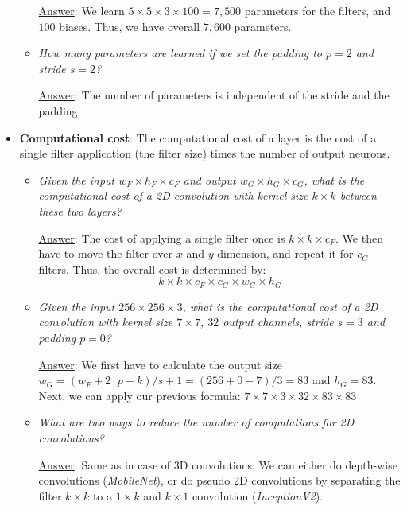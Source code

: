 \begin{itemize}
\begin{itemize}
		\underline{Answer}: We learn $5\times 5\times 3\times 100 = 7,500$ parameters for the filters, and $100$ biases. Thus, we have overall $7,600$ parameters.
		
		\item \textit{How many parameters are learned if we set the padding to $p=2$ and stride $s=2$?}

		\underline{Answer}: The number of parameters is independent of the stride and the padding.
	\end{itemize}
	\item \textbf{Computational cost}: The computational cost of a layer is the cost of a single filter application (the filter size) times the number of output neurons.
	\begin{itemize}
		\item \textit{Given the input $w_F \times h_F \times c_F$ and output $w_G \times h_G \times c_G$, what is the computational cost of a 2D convolution with kernel size $k\times k$ between these two layers?}
		
		\underline{Answer}: The cost of applying a single filter once is $k\times k\times c_F$. We then have to move the filter over $x$ and $y$ dimension, and repeat it for $c_G$ filters. Thus, the overall cost is determined by:
		$$k\times k\times c_F\times c_G\times w_G\times h_G$$
		
		\item \textit{Given the input $256 \times 256 \times 3$, what is the computational cost of a 2D convolution with kernel size $7\times 7$, $32$ output channels, stride $s=3$ and padding $p=0$?}
		
		\underline{Answer}: We first have to calculate the output size $w_G = (w_F + 2\cdot p - k)/s + 1 = (256 + 0 - 7)/3 = 83$ and $h_G = 83$. Next, we can apply our previous formula:
		$7\times 7\times 3\times 32\times 83\times 83$
		
		\item \textit{What are two ways to reduce the number of computations for 2D convolutions?}
		
		\underline{Answer}: Same as in case of 3D convolutions. We can either do depth-wise convolutions (\textit{MobileNet}), or do pseudo 2D convolutions by separating the filter $k\times k$ to a $1\times k$ and $k\times 1$ convolution (\textit{InceptionV2}).
	\end{itemize}
\end{itemize}
